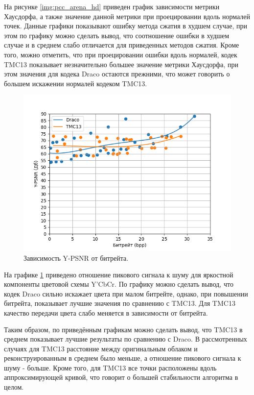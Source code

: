 На рисунке \ref{img:pcc_arena_hd} приведен график зависимости метрики Хаусдорфа,
а также значение данной метрики при проецировании вдоль нормалей точек. Данные
графики показывают ошибку метода сжатия в худшем случае, при этом по графику
можно сделать вывод, что соотношение ошибки в худшем случае и в среднем слабо
отличается для приведенных методов сжатия. Кроме того, можно отметить, что при
проецировании ошибки вдоль нормалей, кодек TMC13 показывает незначительно
большее значение метрики Хаусдорфа, при этом значения для кодека Draco остаются
прежними, что может говорить о большем искажении нормалей кодеком TMC13.

\begin{figure}[H]
    \centering
    \includegraphics[width=\linewidth]{assets/pcc_arena/approx_y_psnr.png}
    \caption{ Зависимость Y-PSNR от битрейта. }
    \label{img:pcc_arena_y_psnr}
\end{figure}

На графике \ref{img:pcc_arena_y_psnr} приведено отношение пикового сигнала к
шуму для яркостной компоненты цветовой схемы Y'CbCr. По графику можно сделать
вывод, что кодек Draco сильно искажает цвета при малом битрейте, однако, при
повышении битрейта, показывает лучшие значения по сравнению с TMC13. Для TMC13
качество передачи цвета слабо меняется в зависимости от битрейта.

Таким образом, по приведённым графикам можно сделать вывод, что TMC13 в среднем
показывает лучшие результаты по сравнению с Draco. В рассмотренных случаях для
TMC13 расстояние между оригинальным облаком и реконструированным в среднем было
меньше, а отношение пикового сигнала к шуму - больше. Кроме того, для TMC13 все
точки расположены вдоль аппроксимирующей кривой, что говорит о большей
стабильности алгоритма в целом.

